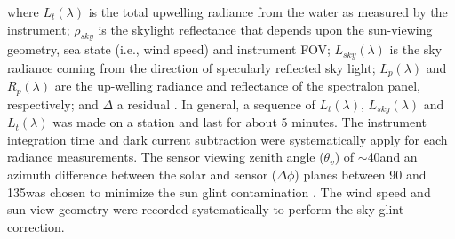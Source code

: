 \documentclass[essd, manuscript]{copernicus}
\begin{document}
where $L_t(\lambda)$ is the total upwelling radiance from the water as measured by the instrument; $\rho_{sky}$ is the skylight reflectance that depends upon the sun-viewing geometry, sea state (i.e., wind speed) and instrument FOV; $L_{sky}(\lambda)$ is the sky radiance coming from the direction of specularly reflected sky light; $L_p(\lambda)$ and $R_p(\lambda)$ are the up-welling radiance and reflectance of the spectralon panel, respectively; and $\Delta$ a residual . In general, a sequence of $L_t(\lambda)$, $L_{sky}(\lambda)$  and $L_t(\lambda)$ was made on a station and last for about 5 minutes. The instrument integration time and dark current subtraction were systematically apply for each radiance measurements. The sensor viewing zenith angle ($\theta_v$) of $\sim$40\degree and an azimuth difference between the solar and sensor ($\Delta\phi$) planes between 90 and 135\degree was chosen to minimize the sun glint contamination \citep{Mobley1999}. The wind speed and sun-view geometry were recorded systematically to perform the sky glint correction.   \\
\end{document}

